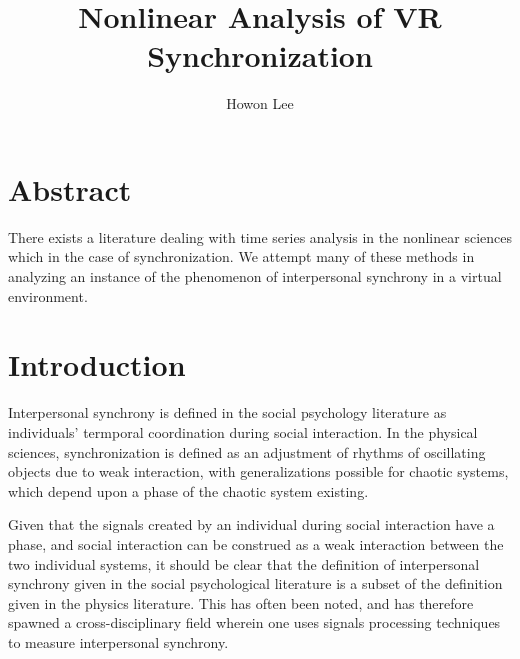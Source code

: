 \documentclass[12pt]{article}
\begin{document}
\title{Nonlinear Analysis of VR Synchronization}
\author{Howon Lee}
\maketitle

\section{Abstract}
There exists a literature dealing with time series analysis in the nonlinear sciences which in the case of synchronization. We attempt many of these methods in analyzing an instance of the phenomenon of interpersonal synchrony in a virtual environment.%

\section{Introduction}








Interpersonal synchrony is defined in the social psychology literature as individuals' termporal coordination during social interaction. In the physical sciences, synchronization is defined as an adjustment of rhythms of oscillating objects due to weak interaction, with generalizations possible for chaotic systems, which depend upon a phase of the chaotic system existing. %

Given that the signals created by an individual during social interaction have a phase, and social interaction can be construed as a weak interaction between the two individual systems, it should be clear that the definition of interpersonal synchrony given in the social psychological literature is a subset of the definition given in the physics literature. This has often been noted, and has therefore spawned a cross-disciplinary field wherein one uses signals processing techniques to measure interpersonal synchrony. %
\end{document}
